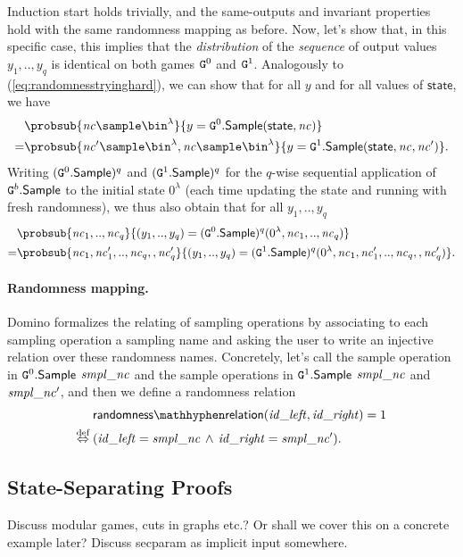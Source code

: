 Induction start holds trivially, and the same-outputs and invariant properties hold with the same randomness mapping as before. Now, let's show that, in this specific case, this implies that the \emph{distribution} of the \emph{sequence} of output values $y_1,..,y_q$ is identical on both games $\text{\texttt{G}}^0$ and $\text{\texttt{G}}^1$. Analogously to (\ref{eq:randomnesstryinghard}), we can show that for all $y$ and for all values of $\mathsf{state}$, we have
\begin{align}
 &\probsub{\n{nc}\sample\bin^\lambda}{y=\M{G}^0.\O{Sample}(\mathsf{state},\n{nc})}\notag\\
=&\probsub{\n{nc}'\sample\bin^\lambda,\n{nc}\sample\bin^\lambda}{y=\M{G}^1.\O{Sample}(\mathsf{state},\n{nc},\n{nc}')}\label{eq:randomnesstryingevenharder}.
\end{align}
Writing $(\text{\texttt{G}}^0.\mathsf{Sample})^q$ and $(\text{\texttt{G}}^1.\mathsf{Sample})^q$ for the $q$-wise sequential application of $\text{\texttt{G}}^b.\mathsf{Sample}$ to the initial state $0^\lambda$ (each time updating the state and running with fresh randomness), we thus also obtain that for all $y_1,..,y_q$
\begin{align*}
 &\probsub{\n{nc}_1,..,\n{nc}_q}{(y_1,..,y_q)=(\M{G}^0.\O{Sample})^q(0^\lambda,\n{nc}_1,..,\n{nc}_q)}\\
=&\probsub{\n{nc}_1,\n{nc}'_1,..,\n{nc}_q,,\n{nc}'_q}{(y_1,..,y_q)=(\M{G}^1.\O{Sample})^q(0^\lambda,\n{nc}_1,\n{nc}'_1,..,\n{nc}_q,,\n{nc}'_q)}.
\end{align*}


\paragraph{Randomness mapping.} Domino formalizes the relating of sampling operations by associating to each sampling operation a sampling name and asking the user to write an injective relation over these randomness names. Concretely, let's call the sample operation in $\text{\texttt{G}}^0.\mathsf{Sample}$ $\mathit{smpl\_nc}$ and the sample operations in $\text{\texttt{G}}^1.\mathsf{Sample}$ $\mathit{smpl\_nc}$ and $\mathit{smpl\_{nc'}}$,
and then we define a randomness relation
\begin{align*}
																				 &\mathsf{randomness\mathhyphen relation}(\n{id\_left},\n{id\_right})=1\\
 \stackrel{\text{def}}{\Leftrightarrow}\;&(\n{id\_left}=\n{smpl\_nc}\,\wedge\,\n{id\_right}=\n{smpl\_nc'}).
\end{align*}

\subsection{State-Separating Proofs}
{\color{blue} Discuss modular games, cuts in graphs etc.? Or shall we cover this on a concrete example later? Discuss secparam as implicit input somewhere.}
